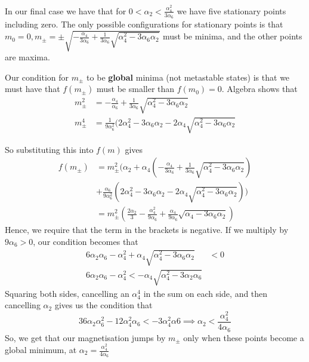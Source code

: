 In our final case we have that for $ 0 < \alpha_2 < \frac{\alpha_4^2 }{3 \alpha_6 }$ 
we have five stationary points including zero. 
The only possible configurations for stationary points is that 
$ m_0  = 0, m_\pm  = \pm \sqrt{  - \frac{\alpha_4}{3\alpha_6 } + \frac{1}{3 \alpha_6 } \sqrt{ \alpha_4^2 - 3 \alpha_6 \alpha_2 } } $ 
must be minima, and the other points are maxima. 

Our condition for $ m_\pm$ to be \textbf{global} minima (not metastable states) 
is that we must have that $ f ( m_\pm) $ must be smaller than $ f (m_0 ) = 0 $. 
Algebra shows that 
\begin{align*}
m_\pm^2 & =  - \frac{\alpha_4}{\alpha_6 } + \frac{1}{ 3 \alpha_6 } \sqrt{ \alpha_4 ^ 2 - 3 \alpha_6 \alpha_2 } \\
m_\pm^ 4 & = \frac{1}{ 9 \alpha_6 ^ 2 } ( 2 \alpha_4 ^ 2 - 3 \alpha_6 \alpha_2  - 2 \alpha_4 \sqrt{ \alpha_4^2 - 3 \alpha_6 \alpha_2 } 
\end{align*}

So substituting this into $ f ( m ) $ gives 
 \begin{align*}
	 f ( m_\pm ) &= m_\pm^2 ( \alpha_2 + \alpha_4 \left(  - \frac{\alpha_4}{3 \alpha_6 } + \frac{1}{3\alpha_6 } \sqrt{ \alpha_4^  2 - 3 \alpha_6 \alpha_2}  \right) \\
		     & +  \frac{\alpha_6}{9 \alpha_6 ^ 2 } \left( 2 \alpha_4 ^ 2 - 3 \alpha_6 \alpha_2 - 2 \alpha_4 \sqrt{ \alpha_4 ^ 2  - 3 \alpha_6 \alpha_2 }  \right)) \\
		     &= m_\pm^2 ( \frac{ 2 \alpha_2 }{ 3 } - \frac{ \alpha_4^ 2 }{ 9 \alpha_6 } + \frac{\alpha_4 }{ 9 \alpha_6 } \sqrt{ \alpha_4  - 3 \alpha_6 \alpha_2} ) 
\end{align*}
Hence, we require that the term in the brackets is negative. 
If we multiply by $ 9 \alpha_6  > 0 $, our condition 
becomes that 
\begin{align*}
	6 \alpha_2 \alpha_6 - \alpha_4^ 2 + \alpha_4 \sqrt{ \alpha_4 ^ 2 - 3 \alpha_6 \alpha_2 }  & <  0  \\
	6 \alpha_2 \alpha_6- \alpha_4^ 2 <   - \alpha_4 \sqrt{ \alpha_4^  2 - 3 \alpha_2 \alpha_6 } 
\end{align*}
Squaring both sides, cancelling an $ \alpha_4 ^ 4 $ in the sum on each side,  and then cancelling 
$ \alpha_ 2 $ gives us the condition that 
 \[
  36 \alpha_2 \alpha_6 ^ 2 - 12 \alpha_4 ^ 2 \alpha_6 <  - 3 \alpha_4 ^ 2 \alpha 6 \implies \alpha_2 < \frac{ \alpha_4 ^ 2 }{4 \alpha_6 }
\] So, we get that our magnetisation jumps by $ m_\pm $ only when 
these points become a global minimum, at  $ \alpha_ 2  = \frac{\alpha_4 ^ 2 }{ 4 \alpha_6 }$ 

